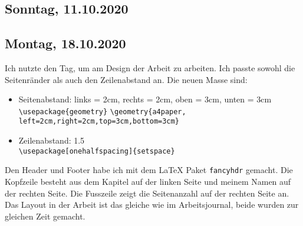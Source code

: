 \documentclass[../main.tex]{subfiles}
\begin{document}
	\subsection{Sonntag, 11.10.2020}
	
	
	\subsection{Montag, 18.10.2020}
	Ich nutzte den Tag, um am Design der Arbeit zu arbeiten.
	Ich passte sowohl die Seitenränder als auch den Zeilenabstand an. 
	Die neuen Masse sind: 
	\begin{singlespace}
	\noindent
	\begin{itemize}
		\item Seitenabstand: links = 2cm, rechts = 2cm, oben = 3cm, unten = 3cm\\[5pt]
		\verb!\usepackage{geometry}!
		\verb!\geometry{a4paper, left=2cm,right=2cm,top=3cm,bottom=3cm}!
		\item Zeilenabstand: 1.5\\[5pt]
		\verb!\usepackage[onehalfspacing]{setspace}!
	\end{itemize}
	\end{singlespace}
	
	\noindent
	Den Header und Footer habe ich mit dem LaTeX Paket \texttt{fancyhdr} gemacht.
	Die Kopfzeile besteht aus dem Kapitel auf der linken Seite und meinem Namen auf der rechten Seite.
	Die Fusszeile zeigt die Seitenanzahl auf der rechten Seite an.
	Das Layout in der Arbeit ist das gleiche wie im Arbeitsjournal, beide wurden zur gleichen Zeit gemacht.
	
	
\end{document}
